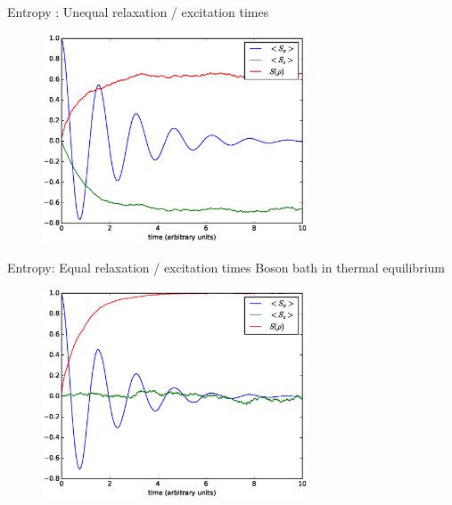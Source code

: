 \documentclass{beamer}
\begin{document}
\begin{frame}{Entropy :  Unequal relaxation / excitation times}
	\begin{figure}[h]
		\centering
		\includegraphics[width=0.7\textwidth]{figs/unequal_bitflip_1000.eps}
	\end{figure}
\end{frame}
\begin{frame}{Entropy: Equal relaxation / excitation times }
	Boson bath in thermal equilibrium
	\begin{figure}[h]
		\centering
		\includegraphics[width=0.7\textwidth]{figs/equal_bitflip_1000.eps}
	\end{figure}
\end{frame}
\end{document}
